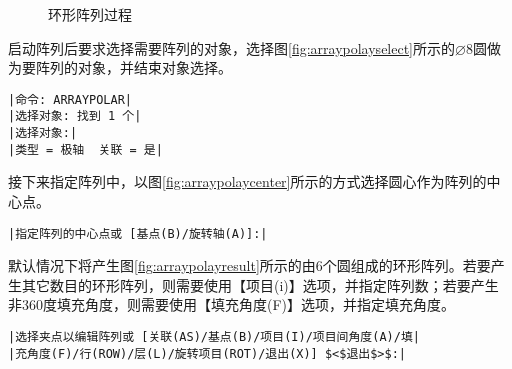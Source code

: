 \begin{procedure}
\begin{figure}[htbp]
\centering
{}\hspace{20pt}
\hspace{20pt}
\caption{环形阵列过程}
\end{figure}

启动阵列后要求选择需要阵列的对象，选择图\ref{fig:arraypolayselect}所示的$\diameter 8$圆做为要阵列的对象，并结束对象选择。
\begin{lstlisting}
|命令: ARRAYPOLAR|
|选择对象: 找到 1 个|
|选择对象:|
|类型 = 极轴  关联 = 是|
\end{lstlisting}
接下来指定阵列中，以图\ref{fig:arraypolaycenter}所示的方式选择圆心作为阵列的中心点。
\begin{lstlisting}
|指定阵列的中心点或 [基点(B)/旋转轴(A)]:|
\end{lstlisting}
默认情况下将产生图\ref{fig:arraypolayresult}所示的由6个圆组成的环形阵列。若要产生其它数目的环形阵列，则需要使用【项目(i)】选项，并指定阵列数；若要产生非360度填充角度，则需要使用【填充角度(F)】选项，并指定填充角度。
\begin{lstlisting}
|选择夹点以编辑阵列或 [关联(AS)/基点(B)/项目(I)/项目间角度(A)/填|
|充角度(F)/行(ROW)/层(L)/旋转项目(ROT)/退出(X)] $<$退出$>$:|
\end{lstlisting}
\end{procedure}
\endinput